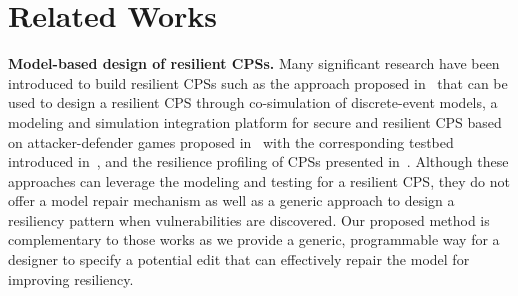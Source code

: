 \section{Related Works}
%
%
%
%
%

\vspace{0.5em}
\noindent
{\bf Model-based design of resilient CPSs.} Many significant research have been introduced to build resilient CPSs such as the approach proposed in~\cite{fitzgerald2012rigorous} that can be used to design a resilient CPS through co-simulation of discrete-event models, a modeling and simulation integration platform for secure and resilient CPS based on attacker-defender games proposed in~\cite{koutsoukos2018sure} with the corresponding testbed introduced in~\cite{neema2018integrated}, and the resilience profiling of CPSs presented in~\cite{jackson28resilience}. Although these approaches can leverage the modeling and testing for a resilient CPS, they do not offer a model repair mechanism as well as a generic approach to design a resiliency pattern when vulnerabilities are discovered. Our proposed method is complementary to those works as we provide a generic, programmable way for a designer to specify a potential edit that can effectively repair the model for improving resiliency.

